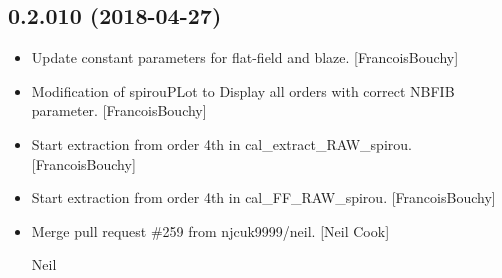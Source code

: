 \documentclass[a4paper,10pt,english]{report}
\begin{document}
\subsection{0.2.010 (2018-04-27)}
\label{\detokenize{misc/changelog:id449}}\begin{itemize}
\item {} 
Update constant parameters for flat-field and blaze. {[}FrancoisBouchy{]}

\item {} 
Modification of spirouPLot to Display all orders with correct NBFIB
parameter. {[}FrancoisBouchy{]}

\item {} 
Start extraction from order 4th in cal\_extract\_RAW\_spirou.
{[}FrancoisBouchy{]}

\item {} 
Start extraction from order 4th in cal\_FF\_RAW\_spirou. {[}FrancoisBouchy{]}

\item {} 
Merge pull request \#259 from njcuk9999/neil. {[}Neil Cook{]}

Neil

\end{itemize}
\end{document}
